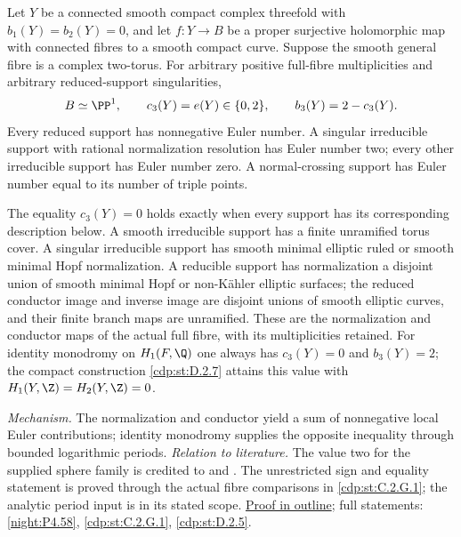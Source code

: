 \hypertarget{main-II-C}{}
\begin{maintheorem}
\hypertarget{tag-03K4}{}\label{series:II:C}
Let $Y$ be a connected smooth compact complex threefold with
$b_1(Y)=b_2(Y)=0$, and let $f:Y\to B$ be a proper surjective
holomorphic map with connected fibres to a smooth compact curve.
Suppose the smooth general fibre is a complex two-torus. For
arbitrary positive full-fibre multiplicities and arbitrary
reduced-support singularities,
\[
 B\simeq\PP^1,\qquad
 c_3(Y)=e(Y)\in\{0,2\},\qquad b_3(Y)=2-c_3(Y).
\]
Every reduced support has nonnegative Euler number. A singular
irreducible support with rational normalization resolution has
Euler number two; every other irreducible support has Euler
number zero. A normal-crossing support has Euler number equal
to its number of triple points.

The equality $c_3(Y)=0$ holds exactly when every support has its
corresponding description below. A smooth irreducible support
has a finite unramified torus cover. A singular irreducible support
has smooth minimal elliptic ruled or smooth minimal Hopf
normalization. A reducible support has normalization a disjoint
union of smooth minimal Hopf or non-K\"ahler elliptic surfaces;
the reduced conductor image and inverse image are disjoint unions
of smooth elliptic curves, and their finite branch maps are
unramified. These are the normalization and conductor maps of
the actual full fibre, with its multiplicities retained.
For identity monodromy on $H_1(F,\Q)$ one always has
$c_3(Y)=0$ and $b_3(Y)=2$; the compact construction
\ref{cdp:st:D.2.7} attains this value with
$H_1(Y,\Z)=H_2(Y,\Z)=0$.

\end{maintheorem}

\textit{Mechanism.} The normalization and conductor yield a sum of
nonnegative local Euler contributions; identity monodromy supplies
the opposite inequality through bounded logarithmic periods.
\textit{Relation to literature.} The value two for the supplied
sphere family is credited to \cite[Theorem~7.22, p.~60]{AC26}
and \cite[Proposition~7.1]{Engel2026}. The unrestricted sign and
equality statement is proved through the actual fibre comparisons
in \ref{cdp:st:C.2.G.1}; the analytic period input is
\cite[\S2, pp.~234--239]{Steenbrink1976} in its stated scope.
\hyperlink{outline-II-C}{Proof in outline}; full statements:
\ref{night:P4.58}, \ref{cdp:st:C.2.G.1}, \ref{cdp:st:D.2.5}.

